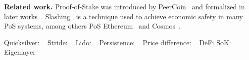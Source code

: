 \noindent
\textbf{Related work.}
Proof-of-Stake was introduced by PeerCoin~\cite{peercoin} and formalized
in later works~\cite{ouroboros,praos,ouroboros-genesis,algorand,DBLP:journals/iacr/BentovPS16a}.
Slashing~\cite{slashing} is a technique used to achieve economic safety
in many PoS systems, among others
PoS Ethereum~\cite{casper,buterin2020combining,sompolinsky2015secure,kiayias2017trees}
and
Cosmos~\cite{2018tendermint,buchman2016tendermint,cosmossdk}.


Quicksilver: ~\cite{quicksilver}
Stride: ~\cite{stride}
Lido: ~\cite{lido}
Persistence: ~\cite{persistence}
Price difference: ~\cite{scharnowski2022liquid}
DeFi SoK: ~\cite{defi-sok}
Eigenlayer~\cite{eigenlayer}
